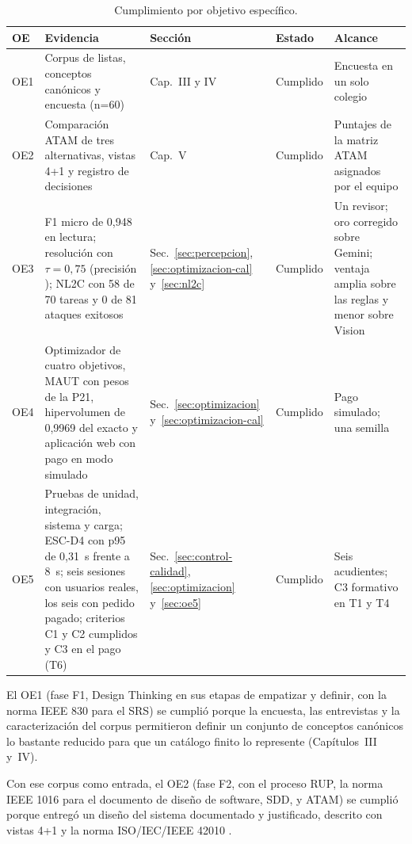 \begin{table}[!htb]
\centering\footnotesize
\setlength{\tabcolsep}{3pt}
\caption{Cumplimiento por objetivo específico.}
\label{tab:cumplimiento}
\begin{tabularx}{\textwidth}{@{}p{0.9cm}Xp{2.9cm}p{1.9cm}p{3.2cm}@{}}
\toprule
OE & Evidencia & Sección & Estado & Alcance \\
\midrule
OE1 & Corpus de listas, conceptos canónicos y encuesta (n=60) & Cap.~III y IV & Cumplido & Encuesta en un solo colegio \\
OE2 & Comparación ATAM de tres alternativas, vistas 4+1 y registro de decisiones & Cap.~V & Cumplido & Puntajes de la matriz ATAM asignados por el equipo \\
OE3 & F1 micro de 0,948 en lectura; resolución con $\tau=0{,}75$ (precisión \calTauP{}); NL2C con 58 de 70 tareas y 0 de 81 ataques exitosos & Sec.~\ref{sec:percepcion}, \ref{sec:optimizacion-cal} y~\ref{sec:nl2c} & Cumplido & Un revisor; oro corregido sobre Gemini; ventaja amplia sobre las reglas y menor sobre Vision \\
OE4 & Optimizador de cuatro objetivos, MAUT con pesos de la P21, hipervolumen de 0,9969 del exacto y aplicación web con pago en modo simulado & Sec.~\ref{sec:optimizacion} y~\ref{sec:optimizacion-cal} & Cumplido & Pago simulado; una semilla \\
OE5 & Pruebas de unidad, integración, sistema y carga; ESC-D4 con p95 de 0,31~s frente a 8~s; seis sesiones con usuarios reales, los seis con pedido pagado; criterios C1 y C2 cumplidos y C3 en el pago (T6) & Sec.~\ref{sec:control-calidad}, \ref{sec:optimizacion} y~\ref{sec:oe5} & Cumplido & Seis acudientes; C3 formativo en T1 y T4 \\
\bottomrule
\end{tabularx}
\end{table}

El OE1 (fase F1, Design Thinking en sus etapas de empatizar y definir, con la norma IEEE 830 para el SRS) se cumplió porque la encuesta, las entrevistas y la caracterización del corpus permitieron definir un conjunto de conceptos canónicos lo bastante reducido para que un catálogo finito lo represente (Capítulos~III y~IV).

Con ese corpus como entrada, el OE2 (fase F2, con el proceso RUP, la norma IEEE 1016 para el documento de diseño de software, SDD, y ATAM) se cumplió porque entregó un diseño del sistema documentado y justificado, descrito con vistas 4+1 \citep{kruchten_41_1995} y la norma ISO/IEC/IEEE 42010 \citep{iso_42010_2022}.

